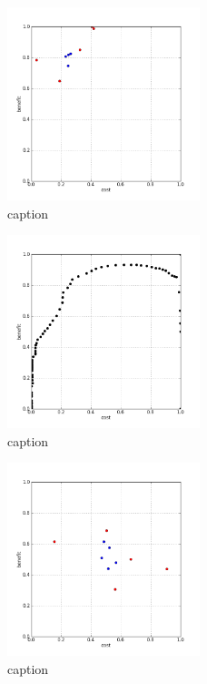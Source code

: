 %
\begin{figure}[!ht]
	\centering
	\includegraphics[width=0.5\textwidth]{img/p1figs/computeFrameStateCubic_sectionCompareBetter_smooth12_tol48.png}
	\caption{caption}
\end{figure}
%
\begin{figure}[!ht]
	\centering
	\includegraphics[width=0.5\textwidth]{img/p1figs/computeFrameStateCubic_sectionCompareBetter_smooth12_tol48_AUC.png}
	\caption{caption}
\end{figure}
%
\begin{figure}[!ht]
	\centering
	\includegraphics[width=0.5\textwidth]{img/p1figs/computeFrameStateCubic_simpleCompare_smooth0_tol0.png}
	\caption{caption}
\end{figure}

